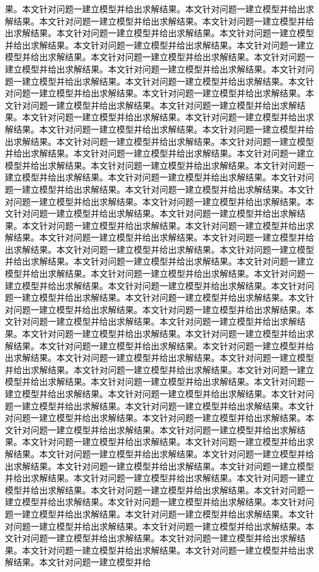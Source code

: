 果。本文针对问题一建立模型并给出求解结果。本文针对问题一建立模型并给出求解结果。本文针对问题一建立模型并给出求解结果。本文针对问题一建立模型并给出求解结果。本文针对问题一建立模型并给出求解结果。本文针对问题一建立模型并给出求解结果。本文针对问题一建立模型并给出求解结果。本文针对问题一建立模型并给出求解结果。本文针对问题一建立模型并给出求解结果。本文针对问题一建立模型并给出求解结果。本文针对问题一建立模型并给出求解结果。本文针对问题一建立模型并给出求解结果。本文针对问题一建立模型并给出求解结果。本文针对问题一建立模型并给出求解结果。本文针对问题一建立模型并给出求解结果。本文针对问题一建立模型并给出求解结果。本文针对问题一建立模型并给出求解结果。本文针对问题一建立模型并给出求解结果。本文针对问题一建立模型并给出求解结果。本文针对问题一建立模型并给出求解结果。本文针对问题一建立模型并给出求解结果。本文针对问题一建立模型并给出求解结果。本文针对问题一建立模型并给出求解结果。本文针对问题一建立模型并给出求解结果。本文针对问题一建立模型并给出求解结果。本文针对问题一建立模型并给出求解结果。本文针对问题一建立模型并给出求解结果。本文针对问题一建立模型并给出求解结果。本文针对问题一建立模型并给出求解结果。本文针对问题一建立模型并给出求解结果。本文针对问题一建立模型并给出求解结果。本文针对问题一建立模型并给出求解结果。本文针对问题一建立模型并给出求解结果。本文针对问题一建立模型并给出求解结果。本文针对问题一建立模型并给出求解结果。本文针对问题一建立模型并给出求解结果。本文针对问题一建立模型并给出求解结果。本文针对问题一建立模型并给出求解结果。本文针对问题一建立模型并给出求解结果。本文针对问题一建立模型并给出求解结果。本文针对问题一建立模型并给出求解结果。本文针对问题一建立模型并给出求解结果。本文针对问题一建立模型并给出求解结果。本文针对问题一建立模型并给出求解结果。本文针对问题一建立模型并给出求解结果。本文针对问题一建立模型并给出求解结果。本文针对问题一建立模型并给出求解结果。本文针对问题一建立模型并给出求解结果。本文针对问题一建立模型并给出求解结果。本文针对问题一建立模型并给出求解结果。本文针对问题一建立模型并给出求解结果。本文针对问题一建立模型并给出求解结果。本文针对问题一建立模型并给出求解结果。本文针对问题一建立模型并给出求解结果。本文针对问题一建立模型并给出求解结果。本文针对问题一建立模型并给出求解结果。本文针对问题一建立模型并给出求解结果。本文针对问题一建立模型并给出求解结果。本文针对问题一建立模型并给出求解结果。本文针对问题一建立模型并给出求解结果。本文针对问题一建立模型并给出求解结果。本文针对问题一建立模型并给出求解结果。本文针对问题一建立模型并给出求解结果。本文针对问题一建立模型并给出求解结果。本文针对问题一建立模型并给出求解结果。本文针对问题一建立模型并给出求解结果。本文针对问题一建立模型并给出求解结果。本文针对问题一建立模型并给出求解结果。本文针对问题一建立模型并给出求解结果。本文针对问题一建立模型并给出求解结果。本文针对问题一建立模型并给出求解结果。本文针对问题一建立模型并给出求解结果。本文针对问题一建立模型并给出求解结果。本文针对问题一建立模型并给出求解结果。本文针对问题一建立模型并给出求解结果。本文针对问题一建立模型并给出求解结果。本文针对问题一建立模型并给出求解结果。本文针对问题一建立模型并给出求解结果。本文针对问题一建立模型并给出求解结果。本文针对问题一建立模型并给出求解结果。本文针对问题一建立模型并给出求解结果。本文针对问题一建立模型并给出求解结果。本文针对问题一建立模型并给出求解结果。本文针对问题一建立模型并给出求解结果。本文针对问题一建立模型并给出求解结果。本文针对问题一建立模型并给出求解结果。本文针对问题一建立模型并给出求解结果。本文针对问题一建立模型并给